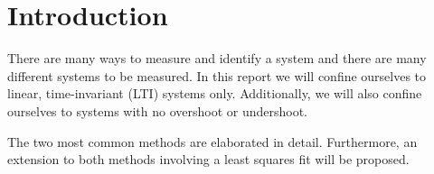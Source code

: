 \section{Introduction}

There  are  many  ways  to  measure  and  identify a system and there  are  many
different  systems  to  be measured. In this report we will confine ourselves to
linear, time-invariant (LTI) systems only. Additionally,  we  will  also confine
ourselves to systems with no overshoot or undershoot.

The two most common methods are elaborated in  detail. Furthermore, an extension
to both methods involving a least squares fit will be proposed.


